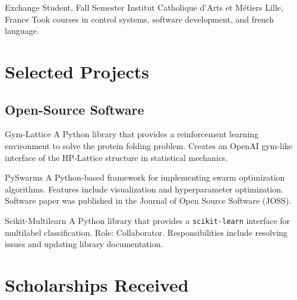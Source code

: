 \documentclass[11pt,a4paper,sans]{moderncv}
\begin{document}
        {Exchange Student, Fall Semester}
        {Institut Catholique d'Arts et M\'etiers}
        {Lille, France}{}
        {Took courses in control systems, software development, and french
        language.
        }

\section{Selected Projects}

\subsection{Open-Source Software}

        {\color{blue} }
        {Gym-Lattice}{}{}
        {
        A Python library that provides a reinforcement learning environment
        to solve the protein folding problem. Creates an OpenAI gym-like
        interface of the HP-Lattice structure in statistical mechanics.
        }

        {\color{blue} }
        {PySwarms}{}{}
        {
        A Python-based framework for implementing swarm optimization
        algorithms. Features include visualization and hyperparameter
        optimization. Software paper was published in the Journal of Open
        Source Software (JOSS).
        }

        {\color{blue} }
        {Scikit-Multilearn}{}{}
        {
        A Python library that provides a \texttt{scikit-learn} interface for
        multilabel classification. Role: Collaborator. Responsibilities include
        resolving issues and updating library documentation.
        }

\section{Scholarships Received}
\nocite{*}


\end{document}
